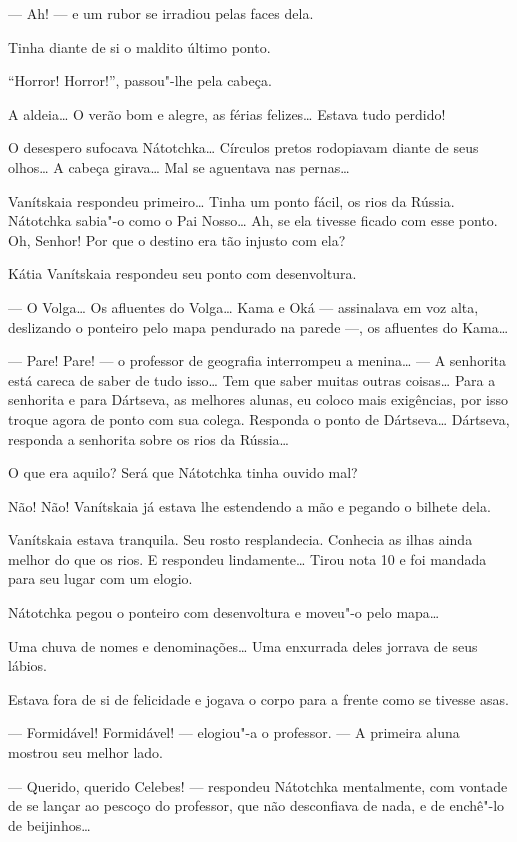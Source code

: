--- Ah! --- e um rubor se irradiou pelas faces dela.

Tinha diante de si o maldito último ponto.

``Horror! Horror!'', passou"-lhe pela cabeça.

A aldeia\ldots{} O verão bom e alegre, as férias felizes\ldots{} Estava tudo
perdido!

O desespero sufocava Nátotchka\ldots{} Círculos pretos rodopiavam diante de
seus olhos\ldots{} A cabeça girava\ldots{} Mal se aguentava nas pernas\ldots{}

Vanítskaia respondeu primeiro\ldots{} Tinha um ponto fácil, os rios da
Rússia. Nátotchka sabia"-o como o Pai Nosso\ldots{} Ah, se ela tivesse ficado
com esse ponto. Oh, Senhor! Por que o destino era tão injusto com ela?

Kátia Vanítskaia respondeu seu ponto com desenvoltura.

--- O Volga\ldots{} Os afluentes do Volga\ldots{} Kama e Oká --- assinalava em voz
alta, deslizando o ponteiro pelo mapa pendurado na parede ---, os
afluentes do Kama\ldots{}

--- Pare! Pare! --- o professor de geografia interrompeu a menina\ldots{} ---
A senhorita está careca de saber de tudo isso\ldots{} Tem que saber muitas
outras coisas\ldots{} Para a senhorita e para Dártseva, as melhores alunas,
eu coloco mais exigências, por isso troque agora de ponto com sua
colega. Responda o ponto de Dártseva\ldots{} Dártseva, responda a senhorita
sobre os rios da Rússia\ldots{}

O que era aquilo? Será que Nátotchka tinha ouvido mal?

Não! Não! Vanítskaia já estava lhe estendendo a mão e pegando o bilhete
dela.

Vanítskaia estava tranquila. Seu rosto resplandecia. Conhecia as ilhas
ainda melhor do que os rios. E respondeu lindamente\ldots{} Tirou nota 10 e
foi mandada para seu lugar com um elogio.

Nátotchka pegou o ponteiro com desenvoltura e moveu"-o pelo mapa\ldots{}

Uma chuva de nomes e denominações\ldots{} Uma enxurrada deles jorrava de seus
lábios.

Estava fora de si de felicidade e jogava o corpo para a frente como se
tivesse asas.

--- Formidável! Formidável! --- elogiou"-a o professor. --- A primeira
aluna mostrou seu melhor lado.

--- Querido, querido Celebes! --- respondeu Nátotchka mentalmente, com
vontade de se lançar ao pescoço do professor, que não desconfiava de
nada, e de enchê"-lo de beijinhos\ldots{}

